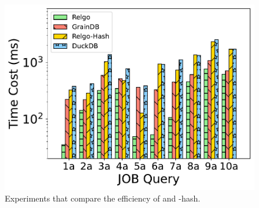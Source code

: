 \begin{figure}[ht]
    \centering
    \includegraphics[width=.9\linewidth]{./figures/exp/hash_plan_job.pdf}
    \caption{Experiments that compare the efficiency of \relgo and \relgo-hash.}
    \label{fig:exp-hash-plan}
\end{figure}

